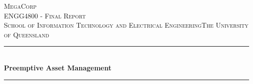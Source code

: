 \begin{titlepage} %
	\newcommand{\HRule}{\rule{\linewidth}{0.5mm}} %

	\center %


	\textsc{\LARGE MegaCorp}\\[1.5cm] %

	\textsc{\Large ENGG4800 - Final Report}\\[0.5cm] %

	\textsc{\large School of Information Technology and Electrical Engineering\newline The University of Queensland}\\[0.5cm] %


	\HRule\\[0.4cm]

	{\huge\bfseries Preemptive Asset Management}\\[0.4cm] %

	\HRule\\[1.5cm]

	\begin{table}[h!]
        \begin{center}
        \begin{tabular}{ |l|c|p{4cm}| }


\end{tabular}
\end{center}
\end{table}
\end{titlepage}

